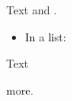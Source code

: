 \documentclass{article}
\begin{document}
Text \cite{k1} and \cite{k2}.
\printbibliography[title=Primary List]
\begin{itemize}
\item In a list: \printbibliography[title=Item List]
\end{itemize}
Text \begin{minipage}{5cm}\printbibliography[title=Box List]\end{minipage} more.
\end{document}
